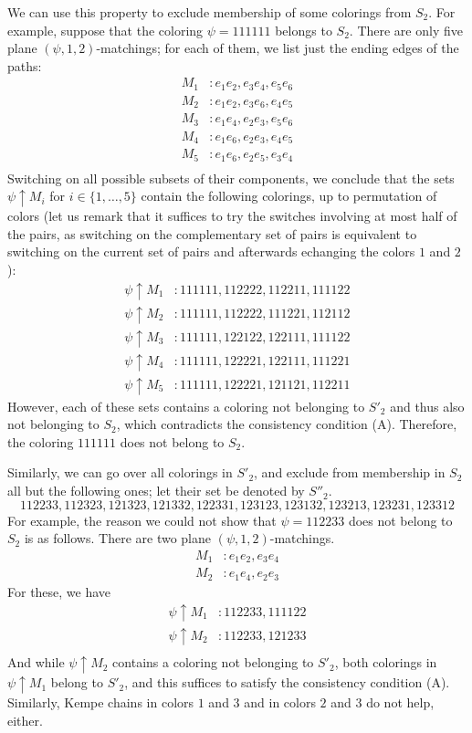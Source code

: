 \documentclass[12pt,twoside,openright,a4paper]{book}
\begin{document}
We can use this property to exclude membership of some colorings from $S_2$.
For example, suppose that the coloring $\psi=111111$ belongs to $S_2$.  There are only five plane $(\psi,1,2)$-matchings;
for each of them, we list just the ending edges of the paths:
\begin{align*}
M_1&: e_1e_2, e_3e_4, e_5e_6\\
M_2&: e_1e_2, e_3e_6, e_4e_5\\
M_3&: e_1e_4, e_2e_3, e_5e_6\\
M_4&: e_1e_6, e_2e_3, e_4e_5\\
M_5&: e_1e_6, e_2e_5, e_3e_4\\
\end{align*}
Switching on all possible subsets of their components, we conclude that the sets $\psi\uparrow M_i$ for $i\in\{1,\ldots, 5\}$ contain the following colorings, up to permutation of colors
(let us remark that it suffices to try the switches involving at most half of the pairs, as switching on the complementary set of pairs is equivalent to switching on the current
set of pairs and afterwards echanging the colors $1$ and $2$):
\begin{align*}
\psi\uparrow M_1&: 111111,112222,112211,111122\\
\psi\uparrow M_2&: 111111,112222,111221,112112\\
\psi\uparrow M_3&: 111111,122122,122111,111122\\
\psi\uparrow M_4&: 111111,122221,122111,111221\\
\psi\uparrow M_5&: 111111,122221,121121,112211
\end{align*}
However, each of these sets contains a coloring not belonging to $S'_2$ and thus also not belonging to $S_2$, which contradicts the consistency condition (A).
Therefore, the coloring $111111$ does not belong to $S_2$.

Similarly, we can go over all colorings in $S'_2$, and exclude from membership
in $S_2$ all but the following ones; let their set be denoted by $S''_2$.
$$112233,112323,121323,121332,122331,123123,123132,123213,123231,123312$$
For example, the reason we could not show that $\psi=112233$ does not belong to $S_2$ is as follows.  There are two plane $(\psi,1,2)$-matchings.
\begin{align*}
M_1&: e_1e_2, e_3e_4\\
M_2&: e_1e_4, e_2e_3
\end{align*}
For these, we have
\begin{align*}
\psi\uparrow M_1&: 112233,111122\\
\psi\uparrow M_2&: 112233,121233\\
\end{align*}
And while $\psi\uparrow M_2$ contains a coloring not belonging to $S'_2$, both colorings in $\psi\uparrow M_1$ belong to $S'_2$, and this suffices to satisfy the consistency condition (A).
Similarly, Kempe chains in colors $1$ and $3$ and in colors $2$ and $3$ do not help, either.
\end{document}
